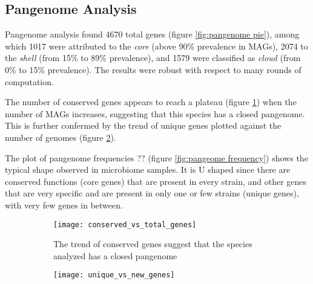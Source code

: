 \subsection*{Pangenome Analysis}
\graphicspath{{images/pangenomeAnalysis}}






Pangenome analysis found 4670 total genes (figure \ref{fig:pangenome pie}), 
among which 1017 were attributed to the \emph{core} (above 90\% prevalence in MAGs),
2074 to the \emph{shell} (from 15\% to 89\% prevalence), and 1579 were classified as \emph{cloud}
(from 0\% to 15\% prevalence). The results were robust with respect to many rounds of computation.

The number of conserved genes appears to reach a plateau (figure \ref{fig:conserved vs total})
when the number of MAGs increases, suggesting that this species has a closed pangenome.
This is further confermed by the trend of unique genes plotted against the number of
genomes (figure \ref{fig:unique vs new}).

The plot of pangenome frequencies ?? (figure \ref{fig:pangeome frequency}) shows the typical shape observed in microbiome samples.
It is U shaped since there are conserved functions (core genes) that are present in every strain, and
other genes that are very specific and are present in only one or few strains (unique genes), with very few genes in between.

\begin{figure}[h]	%
     \centering
     \begin{subfigure}[b]{0.4\textwidth}
         \centering
         \texttt{[image: conserved\_vs\_total\_genes]}
         \caption{\scriptsize{The trend of conserved genes suggest that the species analyzed
                                has a closed pangenome}}
         \label{fig:conserved vs total}
     \end{subfigure}
     \hfill
     \begin{subfigure}[b]{0.4\textwidth}
         \centering
         \texttt{[image: unique\_vs\_new\_genes]}
         \caption{}
         \label{fig:unique vs new}
     \end{subfigure}
        \caption{}
        \label{fig:conserved_unique_genes}
\end{figure}


